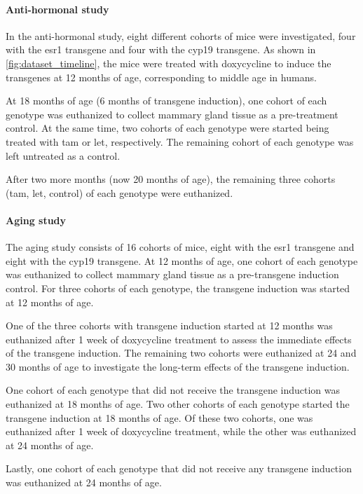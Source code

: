 \paragraph{Anti-hormonal study}
In the anti-hormonal study, eight different cohorts of mice were investigated,
four with the \gls{esr1} transgene and four with the \gls{cyp19} transgene.
As shown in \cref{fig:dataset_timeline}, the mice were treated with doxycycline
to induce the transgenes at 12 months of age, corresponding to middle age in
humans.

At 18 months of age (6 months of transgene induction), one cohort of each
genotype was euthanized to collect mammary gland tissue as a pre-treatment
control.
At the same time, two cohorts of each genotype were started being treated with
\gls{tam} or \gls{let}, respectively.
The remaining cohort of each genotype was left untreated as a control.

After two more months (now 20 months of age), the remaining three cohorts
(\gls{tam}, \gls{let}, control) of each genotype were
euthanized\supercite{furth_esr1_2023}.

\paragraph{Aging study}
The aging study consists of 16 cohorts of mice, eight with the \gls{esr1}
transgene and eight with the \gls{cyp19} transgene.
At 12 months of age, one cohort of each genotype was euthanized to collect
mammary gland tissue as a pre-transgene induction control.
For three cohorts of each genotype, the transgene induction was started at 12
months of age.

One of the three cohorts with transgene induction started at 12 months was
euthanized after 1 week of doxycycline treatment to assess the immediate
effects of the transgene induction.
The remaining two cohorts were euthanized at 24 and 30 months of age to
investigate the long-term effects of the transgene induction.

One cohort of each genotype that did not receive the transgene induction was
euthanized at 18 months of age.
Two other cohorts of each genotype started the transgene induction at 18 months
of age.
Of these two cohorts, one was euthanized after 1 week of doxycycline treatment,
while the other was euthanized at 24 months of age.

Lastly, one cohort of each genotype that did not receive any transgene
induction was euthanized at 24 months of
age\supercite{furth_overexpression_2023}.

